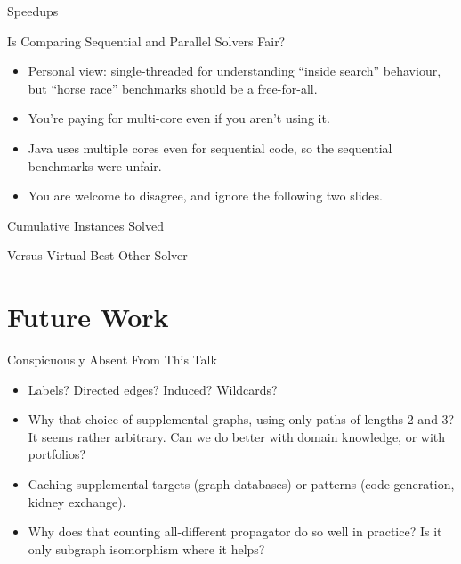 \documentclass{beamer}
\begin{document}
\begin{frame}[t,plain]{Speedups}
    \only<1>{
        
    }
\end{frame}

\begin{frame}{Is Comparing Sequential and Parallel Solvers Fair?}
    \begin{itemize}
        \item Personal view: single-threaded for understanding ``inside search'' behaviour,
            but ``horse race'' benchmarks should be a free-for-all.

        \item You're paying for multi-core even if you aren't using it.

        \item Java uses multiple cores even for sequential code, so the sequential benchmarks were
            unfair.

        \item You are welcome to disagree, and ignore the following two slides.
    \end{itemize}
\end{frame}

\begin{frame}[t,plain]{Cumulative Instances Solved}
    \only<1>{
        
    }
    \only<2>{
        
    }
\end{frame}

\begin{frame}[t,plain]{Versus Virtual Best Other Solver}
    \only<1>{
        
    }
\end{frame}

\section{Future Work}

\begin{frame}{Conspicuously Absent From This Talk}
    \begin{itemize}
        \item Labels? Directed edges? Induced? Wildcards?

        \item Why that choice of supplemental graphs, using only paths of lengths 2 and 3? It seems
            rather arbitrary. Can we do better with domain knowledge, or with portfolios?

        \item Caching supplemental targets (graph databases) or patterns (code generation, kidney
            exchange).

        \item Why does that counting all-different propagator do so well in practice? Is it only
            subgraph isomorphism where it helps?
    \end{itemize}
\end{frame}
\end{document}
